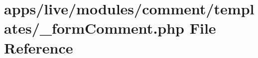 \hypertarget{live_2modules_2comment_2templates_2__form_comment_8php}{\section{apps/live/modules/comment/templates/\-\_\-form\-Comment.php File Reference}
\label{live_2modules_2comment_2templates_2__form_comment_8php}
}
